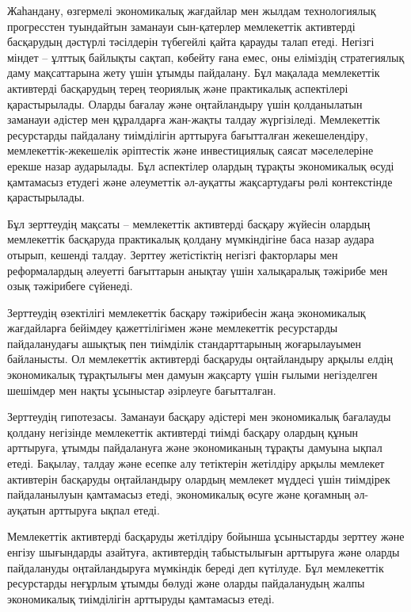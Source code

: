 {Жаһандану, өзгермелі экономикалық жағдайлар мен жылдам технологиялық
прогресстен туындайтын заманауи сын-қатерлер мемлекеттік активтерді
басқарудың дәстүрлі тәсілдерін түбегейлі қайта қарауды талап етеді.
Негізгі міндет -- ұлттық байлықты сақтап, көбейту ғана емес, оны
еліміздің стратегиялық даму мақсаттарына жету үшін ұтымды пайдалану. Бұл
мақалада мемлекеттік активтерді басқарудың терең теориялық және
практикалық аспектілері қарастырылады. Оларды бағалау және оңтайландыру
үшін қолданылатын заманауи әдістер мен құралдарға жан-жақты талдау
жүргізіледі. Мемлекеттік ресурстарды пайдалану тиімділігін арттыруға
бағытталған жекешелендіру, мемлекеттік-жекешелік әріптестік және
инвестициялық саясат мәселелеріне ерекше назар аударылады. Бұл
аспектілер олардың тұрақты экономикалық өсуді қамтамасыз етудегі және
әлеуметтік әл-ауқатты жақсартудағы рөлі контекстінде қарастырылады.

Бұл зерттеудің мақсаты -- мемлекеттік активтерді басқару жүйесін олардың
мемлекеттік басқаруда практикалық қолдану мүмкіндігіне баса назар аудара
отырып, кешенді талдау. Зерттеу жетістіктің негізгі факторлары мен
реформалардың әлеуетті бағыттарын анықтау үшін халықаралық тәжірибе мен
озық тәжірибеге сүйенеді.

Зерттеудің өзектілігі мемлекеттік басқару тәжірибесін жаңа экономикалық
жағдайларға бейімдеу қажеттілігімен және мемлекеттік ресурстарды
пайдаланудағы ашықтық пен тиімділік стандарттарының жоғарылауымен
байланысты. Ол мемлекеттік активтерді басқаруды оңтайландыру арқылы
елдің экономикалық тұрақтылығы мен дамуын жақсарту үшін ғылыми
негізделген шешімдер мен нақты ұсыныстар әзірлеуге бағытталған.

Зерттеудің гипотезасы. Заманауи басқару әдістері мен экономикалық
бағалауды қолдану негізінде мемлекеттік активтерді тиімді басқару
олардың құнын арттыруға, ұтымды пайдалануға және экономиканың тұрақты
дамуына ықпал етеді. Бақылау, талдау және есепке алу тетіктерін
жетілдіру арқылы мемлекет активтерін басқаруды оңтайландыру олардың
мемлекет мүддесі үшін тиімдірек пайдаланылуын қамтамасыз етеді,
экономикалық өсуге және қоғамның әл-ауқатын арттыруға ықпал етеді.

Мемлекеттік активтерді басқаруды жетілдіру бойынша ұсыныстарды зерттеу
және енгізу шығындарды азайтуға, активтердің табыстылығын арттыруға және
оларды пайдалануды оңтайландыруға мүмкіндік береді деп күтілуде. Бұл
мемлекеттік ресурстарды неғұрлым ұтымды бөлуді және оларды пайдаланудың
жалпы экономикалық тиімділігін арттыруды қамтамасыз етеді.

}
